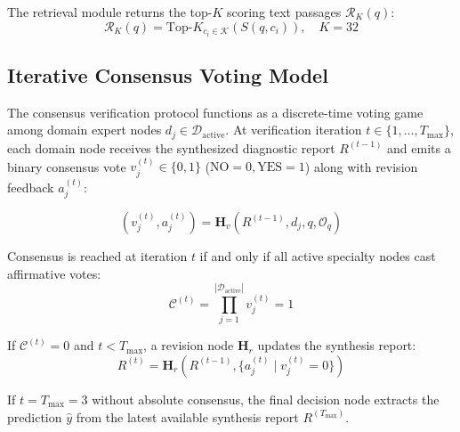 The retrieval module returns the top-$K$ scoring text passages $\mathcal{R}_K(q)$:
\begin{equation}
    \mathcal{R}_K(q) = \text{Top-}K_{c_i \in \mathcal{K}} \left( S(q, c_i) \right), \quad K = 32
\end{equation}

\subsection{Iterative Consensus Voting Model}

The consensus verification protocol functions as a discrete-time voting game among domain expert nodes $d_j \in \mathcal{D}_{\text{active}}$. At verification iteration $t \in \{1, \dots, T_{\max}\}$, each domain node receives the synthesized diagnostic report $R^{(t-1)}$ and emits a binary consensus vote $v_{j}^{(t)} \in \{0, 1\}$ ($\text{NO} = 0, \text{YES} = 1$) along with revision feedback $a_{j}^{(t)}$:

\begin{equation}
    (v_{j}^{(t)}, a_{j}^{(t)}) = \mathbf{H}_{v}\left( R^{(t-1)}, d_j, q, \mathcal{O}_q \right)
\end{equation}

Consensus is reached at iteration $t$ if and only if all active specialty nodes cast affirmative votes:
\begin{equation}
    \mathcal{C}^{(t)} = \prod_{j=1}^{|\mathcal{D}_{\text{active}}|} v_{j}^{(t)} = 1
\end{equation}

If $\mathcal{C}^{(t)} = 0$ and $t < T_{\max}$, a revision node $\mathbf{H}_r$ updates the synthesis report:
\begin{equation}
    R^{(t)} = \mathbf{H}_r\left( R^{(t-1)}, \{a_{j}^{(t)} \mid v_{j}^{(t)} = 0\} \right)
\end{equation}

If $t = T_{\max} = 3$ without absolute consensus, the final decision node extracts the prediction $\hat{y}$ from the latest available synthesis report $R^{(T_{\max})}$.
